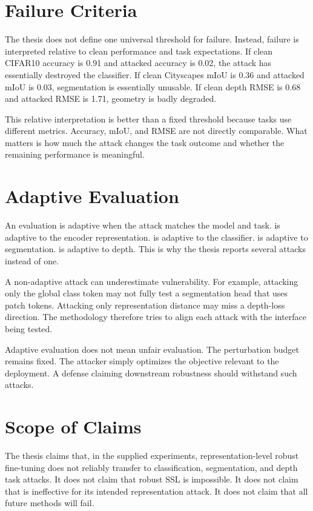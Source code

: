 \section{Failure Criteria}

The thesis does not define one universal threshold for failure. Instead, failure is interpreted relative to clean performance and task expectations. If clean CIFAR10 accuracy is 0.91 and attacked accuracy is 0.02, the attack has essentially destroyed the classifier. If clean Cityscapes mIoU is 0.36 and attacked mIoU is 0.03, segmentation is essentially unusable. If clean depth RMSE is 0.68 and attacked RMSE is 1.71, geometry is badly degraded.

This relative interpretation is better than a fixed threshold because tasks use different metrics. Accuracy, mIoU, and RMSE are not directly comparable. What matters is how much the attack changes the task outcome and whether the remaining performance is meaningful.

\section{Adaptive Evaluation}

An evaluation is adaptive when the attack matches the model and task. \EmbedAttack is adaptive to the encoder representation. \PGD is adaptive to the classifier. \SegPGD is adaptive to segmentation. \DepthPGD is adaptive to depth. This is why the thesis reports several attacks instead of one.

A non-adaptive attack can underestimate vulnerability. For example, attacking only the global class token may not fully test a segmentation head that uses patch tokens. Attacking only representation distance may miss a depth-loss direction. The methodology therefore tries to align each attack with the interface being tested.

Adaptive evaluation does not mean unfair evaluation. The perturbation budget remains fixed. The attacker simply optimizes the objective relevant to the deployment. A defense claiming downstream robustness should withstand such attacks.

\section{Scope of Claims}

The thesis claims that, in the supplied experiments, representation-level robust fine-tuning does not reliably transfer to classification, segmentation, and depth task attacks. It does not claim that robust SSL is impossible. It does not claim that \DeACL is ineffective for its intended representation attack. It does not claim that all future methods will fail.

